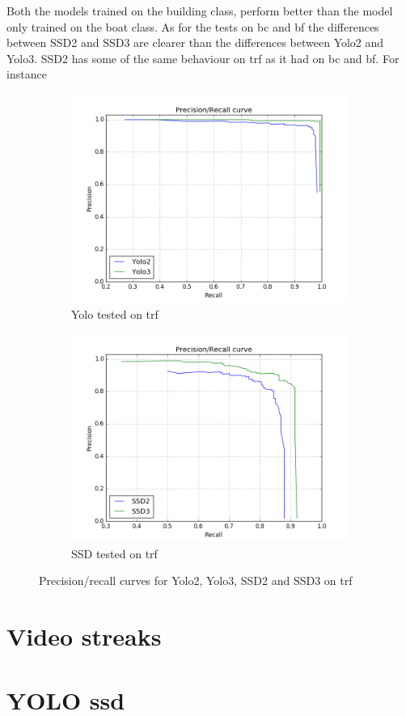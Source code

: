 \vspace{3mm}

Both the models trained on the building class, perform better than the model only trained on the boat class. As for the tests on bc and bf the differences between SSD2 and SSD3 are clearer than the differences between Yolo2 and Yolo3. SSD2 has some of the same behaviour on trf as it had on bc and bf. For instance 


\begin{figure}[h!]
\begin{subfigure}{.5\textwidth}
  \centering
  \includegraphics[width=0.8\linewidth]{results/case_buildings/prec_recall/yolo/trf.png}
  \caption{Yolo tested on trf}
  \label{fig:ex_trf_prec_rec_yolo}
\end{subfigure}%
\begin{subfigure}{.5\textwidth}
  \centering
  \includegraphics[width=.8\linewidth]{results/case_buildings/prec_recall/ssd/trf.png}
  \caption{SSD tested on trf}
  \label{fig:ex_trf_prec_rec_ssd}
\end{subfigure}
\caption{Precision/recall curves for Yolo2, Yolo3, SSD2 and SSD3 on trf}
\label{fig:trf_prec}
\end{figure}









\newpage

\section{Video streaks}
\section{YOLO ssd}

